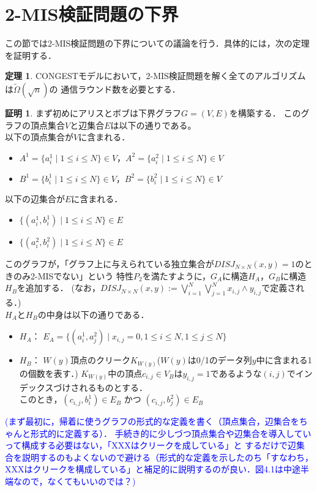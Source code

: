 \documentclass[12pt]{thesis}
\newcommand{\Izumi}[1]{\textcolor{blue}{(#1)}}
\newcommand{\CONGEST}{\textsf{CONGEST}}
\theoremstyle{definition}
\newtheorem{theorem}{定理}[chapter]
\newtheorem*{prf*}{証明}
\begin{document}
\section{2-MIS検証問題の下界}

この節では2-MIS検証問題の下界についての議論を行う．具体的には，次の定理を証明する．
\begin{theorem}
{\CONGEST}モデルにおいて，2-MIS検証問題を解く全てのアルゴリズムは$\tilde{\Omega} (\sqrt{n})$の
通信ラウンド数を必要とする．
\end{theorem}
\begin{prf*}

まず初めにアリスとボブは下界グラフ$G = (V, E)$を構築する．
このグラフの頂点集合$V$と辺集合$E$は以下の通りである。 \\
以下の頂点集合が$V$に含まれる．
\begin{itemize}
\item $A^{1} = \{a^{1}_{i} \mid 1\leq i \leq N\}  \in V$，$A^{2} = \{a^{2}_{i} \mid 1\leq i \leq N\} \in V$
\item $B^{1} = \{b^{1}_{i} \mid 1\leq i \leq N\}  \in V$，$B^{2} = \{b^{2}_{i} \mid 1\leq i \leq N\} \in V$
\end{itemize}
以下の辺集合が$E$に含まれる．
\begin{itemize}
\item $\{(a^{1}_{i}, b^{1}_{i}) \mid 1\leq i \leq N\} \in E$
\item $\{(a^{2}_{i}, b^{2}_{i}) \mid 1\leq i \leq N\} \in E$
\end{itemize}
このグラフが，「グラフ上に与えられている独立集合が$DISJ_{N \times N} (x, y) = 1$のときのみ2-MISでない」という
特性$P_{2}$を満たすように，$G_{A}$に構造$H_{A}$，$G_{B}$に構造$H_{B}$を追加する．
(なお，$DISJ_{N \times N} (x, y) :=\bigvee_{i = 1}^{N} \bigvee_{j = 1}^{N} x_{i, j} \land y_{i, j}$で定義される．)\\
$H_{A}$と$H_{B}$の中身は以下の通りである．
\begin{itemize}
\item $H_{A}$： $E_{A}=\{(a^{1}_{i},a^{2}_{j}) \mid x_{i,j}=0, 1 \leq i \leq N, 1 \leq j \leq N\}$
\item $H_{B}$： $W(y)$頂点のクリーク$K_{W(y)}$($W(y)$は0/1のデータ列$y$中に含まれる1の個数を表す．)
$K_{W(y)}$中の頂点$c_{i, j} \in V_{B}$は$y_{i, j} = 1$であるような$(i, j)$でインデックスづけされるものとする． \\
このとき，$(c_{i, j}, b_{i}^{1}) \in E_{B}$ かつ $(c_{i, j}, b_{j}^{2}) \in E_{B}$ 
\end{itemize}
\Izumi{まず最初に，帰着に使うグラフの形式的な定義を書く（頂点集合，辺集合をちゃんと形式的に定義する）．
手続き的に少しづつ頂点集合や辺集合を導入していって構成する必要はない，「XXXはクリークを成している」と
するだけで辺集合を説明するのもよくないので避ける（形式的な定義を示したのち「すなわち，XXXはクリークを構成している」と補足的に説明するのが良い．図4.1は中途半端なので，なくてもいいのでは？}


\end{prf*}
\end{document}
